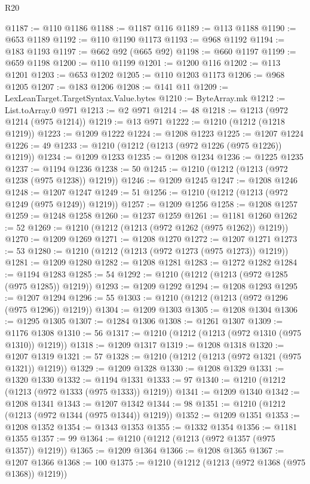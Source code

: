 \begin{lexlean}{R20}
\begin{coremodule}
@1187 := @110 @1186
@1188 := @1187 @116
@1189 := @113 @1188
@1190 := @653 @1189
@1192 := @110 @1190 @1173
@1193 := @968 @1192
@1194 := @183 @1193
@1197 := @662 @92 (@665 @92)
@1198 := @660 @1197
@1199 := @659 @1198
@1200 := @110 @1199
@1201 := @1200 @116
@1202 := @113 @1201
@1203 := @653 @1202
@1205 := @110 @1203 @1173
@1206 := @968 @1205
@1207 := @183 @1206
@1208 := @141 @11
@1209 := LexLeanTarget.TargetSyntax.Value.bytes
@1210 := ByteArray.mk
@1212 := List.toArray.{0} @971
@1213 := @2 @971
@1214 := 48
@1218 := @1213 (@972 @1214 (@975 @1214))
@1219 := @13 @971
@1222 := @1210 (@1212 (@1218 @1219))
@1223 := @1209 @1222
@1224 := @1208 @1223
@1225 := @1207 @1224
@1226 := 49
@1233 := @1210 (@1212 (@1213 (@972 @1226 (@975 @1226)) @1219))
@1234 := @1209 @1233
@1235 := @1208 @1234
@1236 := @1225 @1235
@1237 := @1194 @1236
@1238 := 50
@1245 := @1210 (@1212 (@1213 (@972 @1238 (@975 @1238)) @1219))
@1246 := @1209 @1245
@1247 := @1208 @1246
@1248 := @1207 @1247
@1249 := 51
@1256 := @1210 (@1212 (@1213 (@972 @1249 (@975 @1249)) @1219))
@1257 := @1209 @1256
@1258 := @1208 @1257
@1259 := @1248 @1258
@1260 := @1237 @1259
@1261 := @1181 @1260
@1262 := 52
@1269 := @1210 (@1212 (@1213 (@972 @1262 (@975 @1262)) @1219))
@1270 := @1209 @1269
@1271 := @1208 @1270
@1272 := @1207 @1271
@1273 := 53
@1280 := @1210 (@1212 (@1213 (@972 @1273 (@975 @1273)) @1219))
@1281 := @1209 @1280
@1282 := @1208 @1281
@1283 := @1272 @1282
@1284 := @1194 @1283
@1285 := 54
@1292 := @1210 (@1212 (@1213 (@972 @1285 (@975 @1285)) @1219))
@1293 := @1209 @1292
@1294 := @1208 @1293
@1295 := @1207 @1294
@1296 := 55
@1303 := @1210 (@1212 (@1213 (@972 @1296 (@975 @1296)) @1219))
@1304 := @1209 @1303
@1305 := @1208 @1304
@1306 := @1295 @1305
@1307 := @1284 @1306
@1308 := @1261 @1307
@1309 := @1176 @1308
@1310 := 56
@1317 := @1210 (@1212 (@1213 (@972 @1310 (@975 @1310)) @1219))
@1318 := @1209 @1317
@1319 := @1208 @1318
@1320 := @1207 @1319
@1321 := 57
@1328 := @1210 (@1212 (@1213 (@972 @1321 (@975 @1321)) @1219))
@1329 := @1209 @1328
@1330 := @1208 @1329
@1331 := @1320 @1330
@1332 := @1194 @1331
@1333 := 97
@1340 := @1210 (@1212 (@1213 (@972 @1333 (@975 @1333)) @1219))
@1341 := @1209 @1340
@1342 := @1208 @1341
@1343 := @1207 @1342
@1344 := 98
@1351 := @1210 (@1212 (@1213 (@972 @1344 (@975 @1344)) @1219))
@1352 := @1209 @1351
@1353 := @1208 @1352
@1354 := @1343 @1353
@1355 := @1332 @1354
@1356 := @1181 @1355
@1357 := 99
@1364 := @1210 (@1212 (@1213 (@972 @1357 (@975 @1357)) @1219))
@1365 := @1209 @1364
@1366 := @1208 @1365
@1367 := @1207 @1366
@1368 := 100
@1375 := @1210 (@1212 (@1213 (@972 @1368 (@975 @1368)) @1219))

\end{coremodule}
\end{lexlean}
